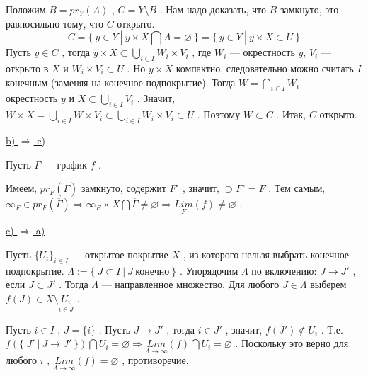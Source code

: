 Положим \( B = pr_Y(A) \) , \( C = Y \setminus B \) . Нам надо доказать, что \( B \) замкнуто, это равносильно тому, что \( C \) открыто.
\[ C = \{~y \in Y~|~y \times X \bigcap A = \varnothing ~\} = \{~y \in Y~|~y \times X \subset U ~\} \]
Пусть \( y \in C \) , тогда \( y \times X \subset \underset{i \in I}{\bigcup} W_i \times V_i \) , где \( W_i \) --- окрестность \( y \), \( V_i \) --- открыто в \( X \) и \( W_i \times V_i \subset U \) . Но \( y \times X \) компактно, следовательно можно считать \( I \) конечным (заменяя на конечное подпокрытие). Тогда \( W = \underset{i \in I}{\bigcap} W_i \) --- окрестность \( y \) и \( X \subset \underset{i \in I}{\bigcup} V_i \) . Значит, \( W \times X = \underset{i \in I}{\bigcup} W \times V_i \subset \underset{i \in I}{\bigcup} W_i \times V_i \subset U \) . Поэтому \( W \subset C \) . Итак, \( C \) открыто.

\vspace

\underline{b) \( \Rightarrow \) c)}
\vspace

Пусть \( \Gamma \) --- график \( f \) .


Имеем, \( pr_F(\overline{\Gamma}) \) замкнуто, содержит \( F^{\circ} \) , значит, \( \supset \overline{F^{\circ}}=F \) . Тем самым, \( \infty_F \in pr_F(\overline{\Gamma}) \Rightarrow \infty_F\times X \bigcap \overline{\Gamma} \neq \varnothing \Rightarrow \underset{F}{Lim}(f) \neq \varnothing \) .

\vspace
\underline{c) \( \Rightarrow \) a)}
\vspace

Пусть \( \{U_i\}_{i \in I} \) --- открытое покрытие \( X \) , из которого нельзя выбрать конечное подпокрытие. \( \Lambda:=\{~J \subset I~|~J~ \text{конечно} ~\} \) . Упорядочим \( \Lambda \) по включению: \( J \rightarrow J' \) , если \( J \subset J' \) . Тогда \( \Lambda \) --- направленное множество. Для любого \( J \in \Lambda \) выберем \( f(J) \in X \setminus \underset{i \in J}{U_i} \) .

Пусть \( i \in I \) , \( J=\{i\} \) . Пусть \( J \rightarrow J' \) , тогда \( i \in J' \) , значит, \( f(J') \notin U_i \) . Т.е. \( f(\{~J'~|~J \rightarrow J'~\}) \bigcap U_i = \varnothing \Rightarrow \underset{\Lambda \rightarrow \infty}{Lim}(f) \bigcap U_i = \varnothing \) . Поскольку это верно для любого \( i \) , \( \underset{\Lambda \rightarrow \infty}{Lim}(f) = \varnothing \) , противоречие.

